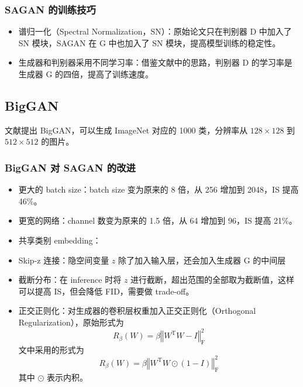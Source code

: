 \subsubsection{SAGAN 的训练技巧}
\begin{itemize}
  \item 谱归一化（Spectral Normalization，SN）：原始论文只在判别器 D 中加入了 SN
    模块，SAGAN 在 G 中也加入了 SN 模块，提高模型训练的稳定性。
  \item 生成器和判别器采用不同学习率：借鉴文献中的思路，判别器
    D 的学习率是生成器 G 的四倍，提高了训练速度。
\end{itemize}

\subsection{BigGAN}
文献提出 BigGAN，可以生成 ImageNet 对应的 1000 类，分辨率从
$128 \times 128$ 到 $512 \times 512$ 的图片。

\subsubsection{BigGAN 对 SAGAN 的改进}

\begin{itemize}
  \item 更大的 batch size：batch size 变为原来的 8 倍，从 256 增加到 2048，IS 提高 46\%。
  \item 更宽的网络：channel 数变为原来的 1.5 倍，从 64 增加到 96，IS 提高 21\%。
  \item 共享类别 embedding：
  \item Skip-z 连接：隐空间变量 $z$ 除了加入输入层，还会加入生成器 G 的中间层
  \item 截断分布：在 inference 时将 $z$ 进行截断，超出范围的全部取为截断值，这样
    可以提高 IS，但会降低 FID，需要做 trade-off。
  \item 正交正则化：对生成器的卷积层权重加入正交正则化（Orthogonal
    Regularization），原始形式为
    \begin{equation}
      R_{\beta}(W) = \beta \left\Vert W^{\mathrm{T}}W-I\right\Vert _{\mathrm{F}}^2
    \end{equation}
    文中采用的形式为
    \begin{equation}
      R_{\beta}(W) = \beta \left\Vert W^{\mathrm{T}}W \odot (1-I)\right\Vert _{\mathrm{F}}^2
    \end{equation}
    其中 $\odot$ 表示内积。
\end{itemize}

